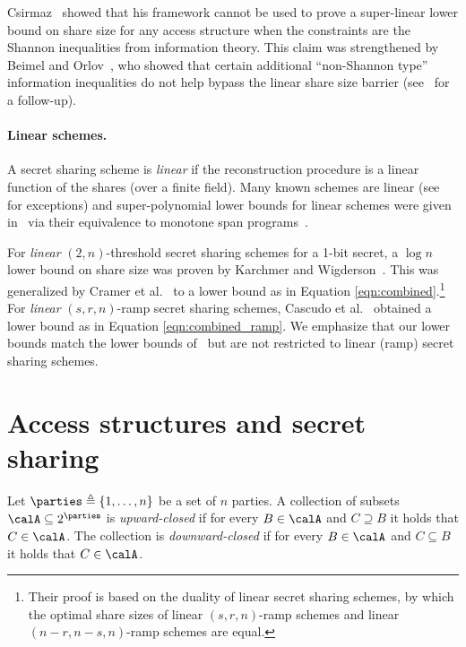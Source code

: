 \documentclass{toc}
\begin{document}
Csirmaz~\cite{Csirmaz97} showed that his framework cannot be used to
prove a super-linear lower bound on share size for any access structure when the constraints are the Shannon inequalities from information theory. This 
claim was strengthened by Beimel and Orlov~\cite{BeimelO11}, who showed that certain additional 
``non-Shannon type'' information inequalities do not help bypass the linear share
size barrier (see~\cite{MolleviPY16} for a follow-up).

\paragraph{Linear schemes.}
A secret sharing scheme is \emph{linear} if the reconstruction procedure is a
linear function of the shares (over a finite field). Many known
schemes are linear (see~\cite{BeimelI01,BeimelW05,KomargodskiNY16,VaikuntanathanV15,BIVW,LiuVW17,LiuV18} for exceptions) and
super-polynomial lower bounds for linear schemes were given in~\cite{BabaiGW99,BeimelGP97,Gal01,pitassi-robere} via their equivalence to monotone span programs~\cite{KarchmerW93}. 

For \emph{linear} $(2,n)$-threshold secret sharing schemes for a 1-bit secret, a
$\log n$ lower bound on share size was proven by Karchmer and
Wigderson~\cite{KarchmerW93}. This was generalized by Cramer et al.~\cite{CramerF02} to a lower bound as in Equation \eqref{eqn:combined}.\footnote{Their proof is based on the duality of linear secret sharing schemes, by which the optimal share sizes of linear $(s, r, n)$-ramp schemes and linear $(n-r, n-s, n)$-ramp schemes are equal.}
For \emph{linear} $(s,r,n)$-ramp secret sharing schemes, 
Cascudo et al.~\cite{PueyoCX13} obtained a
lower bound as in Equation \eqref{eqn:combined_ramp}. We emphasize that our
lower bounds match the lower bounds of~\cite{PueyoCX13} but are not restricted
to linear (ramp) secret sharing schemes.

\section{Access structures and secret sharing}
\label{sec:prelim}

%
Let $\parties \triangleq \{1,\dots,n\}$ be a set of $n$ parties. A
collection of subsets $\calA\subseteq 2^\parties$ is \emph{upward-closed} 
if for every $B\in \calA$ and $C\supseteq B$ it holds that $C\in
\calA$.  The collection is \emph{downward-closed} if for every 
$B\in \calA$ and $C \subseteq B$ it holds that $C\in \calA$.
\end{document}
